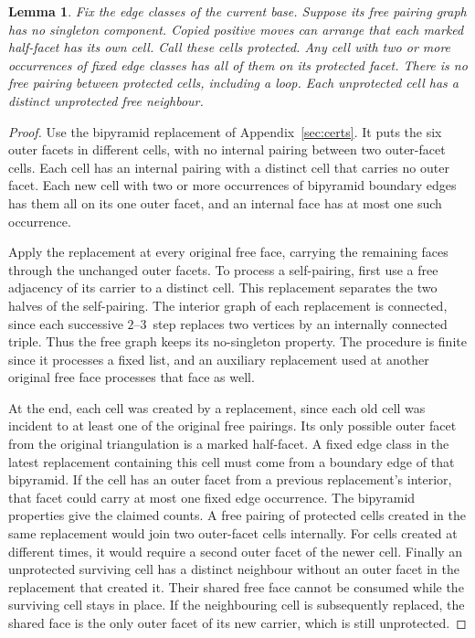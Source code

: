 \documentclass[11pt]{amsart}
\newtheorem{lemma}[theorem]{Lemma}
\newcommand{\moveup}{\(2\)--\(3\)}
\begin{document}
\begin{lemma}\label{lem:separate}
Fix the edge classes of the current base. Suppose its free pairing graph
has no singleton component. Copied positive moves can arrange that each
marked half-facet has its own cell. Call these cells protected. Any cell
with two or more occurrences of fixed edge classes has all of them
on its protected facet. There is no free pairing between protected
cells, including a loop. Each unprotected cell has a distinct
unprotected free neighbour.
\end{lemma}
\begin{proof}
Use the bipyramid replacement of Appendix~\ref{sec:certs}. It puts
the six outer facets in different cells, with no internal pairing
between two outer-facet cells. Each cell has an internal pairing
with a distinct cell that carries no outer facet. Each new cell with
two or more occurrences of bipyramid boundary edges has them all on
its one outer facet, and an internal face has at most one such
occurrence.

Apply the replacement at every original free face, carrying the
remaining faces through the unchanged outer facets. To process a
self-pairing, first use a free adjacency of its carrier to a distinct
cell. This replacement separates the two halves of the self-pairing.
The interior graph of each replacement is connected, since each
successive \moveup\ step replaces two vertices by an internally
connected triple. Thus the free graph keeps its no-singleton
property. The procedure is finite since it processes a fixed list,
and an auxiliary replacement used at another original free face
processes that face as well.

At the end, each cell was created by a replacement, since each old
cell was incident to at least one of the original free pairings.
Its only possible outer facet from the original triangulation is a
marked half-facet. A fixed edge class in the latest replacement
containing this cell must come from a boundary edge of that
bipyramid. If the cell has an outer facet from a previous
replacement's interior, that facet could carry at most one fixed
edge occurrence. The bipyramid properties give the claimed counts.
A free pairing of protected cells created in the same replacement
would join two outer-facet cells internally. For cells created at
different times, it would require a second outer facet of the newer
cell. Finally an unprotected surviving cell has a distinct neighbour
without an outer facet in the replacement that created it. Their shared
free face cannot be consumed while the surviving cell stays in place.
If the neighbouring cell is subsequently replaced, the shared face is
the only outer facet of its new carrier, which is still unprotected.
\end{proof}
\end{document}
